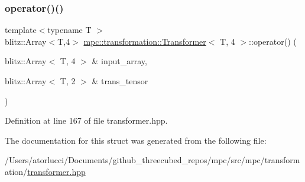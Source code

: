 \subsubsection{\texorpdfstring{operator()()}{operator()()}}
{\footnotesize\ttfamily template$<$typename T $>$ \\
blitz\+::\+Array$<$T,4$>$ \mbox{\hyperlink{structmpc_1_1transformation_1_1_transformer}{mpc\+::transformation\+::\+Transformer}}$<$ T, 4 $>$\+::operator() (\begin{DoxyParamCaption}\item[{blitz\+::\+Array$<$ T, 4 $>$ \&}]{input\+\_\+array,  }\item[{blitz\+::\+Array$<$ T, 2 $>$ \&}]{trans\+\_\+tensor }\end{DoxyParamCaption})\hspace{0.3cm}{\ttfamily [inline]}}



Definition at line 167 of file transformer.\+hpp.



The documentation for this struct was generated from the following file\+:\begin{DoxyCompactItemize}
\item 
/\+Users/atorlucci/\+Documents/github\+\_\+threecubed\+\_\+repos/mpc/src/mpc/transformation/\mbox{\hyperlink{transformer_8hpp}{transformer.\+hpp}}\end{DoxyCompactItemize}
